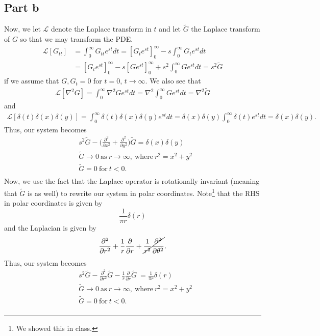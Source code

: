 \documentclass{article}
\begin{document}
\subsection{Part b}
Now, we let $\mathcal{L}$ denote the Laplace transform in $t$ and let $\tilde{G}$ the Laplace transform of $G$ so that we may transform the PDE. 
\begin{align*}
\mathcal{L}[G_{tt}]&=\int_{0}^{\infty}G_{tt}e^{st}dt=\left[G_te^{st}\right]_0^\infty-s\int_{0}^{\infty}G_te^{st}dt\\&=
\left[G_te^{st}\right]_0^\infty-s\left[Ge^{st}\right]_0^\infty+s^2\int_{0}^{\infty}Ge^{st}dt=s^2\tilde{G}
\end{align*}
if we assume that $G,G_t=0$ for $t=0$, $t\to\infty$. We also see that
\begin{align*}
\mathcal{L}[\nabla^2 G]=\int_{0}^{\infty}\nabla^2G e^{st}dt=\nabla^2\int_{0}^{\infty}G e^{st}dt=\nabla^2\tilde{G}
\end{align*}
and
\begin{align*}
\mathcal{L}[\delta(t)\delta(x)\delta(y)]=\int_{0}^{\infty}\delta(t)\delta(x)\delta(y) e^{st}dt=\delta(x)\delta(y)\int_{0}^{\infty}\delta(t)e^{st}dt=\delta(x)\delta(y).
\end{align*}
Thus, our system becomes
\begin{equation*}
	\begin{split}
		&s^2\tilde{G} - \big(\frac{\partial^2}{\partial x^2}+\frac{\partial^2}{\partial y^2}\big)\tilde{G} = \delta(x)\delta(y)\\
		&\tilde G \to 0 \ \text{as} \ r \to \infty, \ \text{where} \ r^2 = x^2+y^2\\
		&\tilde G = 0 \ \text{for}\  t<0.\\
	\end{split}
\end{equation*}
Now, we use the fact that the Laplace operator is rotationally invariant (meaning that $\tilde{G}$ is as well) to rewrite our system in polar coordinates. Note\footnote{We showed this in class.}  that the RHS in polar coordinates is given by
\[
\frac{1}{\pi r}\delta(r)
\]
and the Laplacian is given by
\[
\frac{\partial^2}{\partial r^2}+\frac{1}{r}\frac{\partial}{\partial r}+\cancel{\frac{1}{r^2}\frac{\partial^2}{\partial \theta^2}}.
\]
Thus, our system becomes
\begin{equation*}
	\begin{split}
		&s^2\tilde{G} - \frac{\partial^2}{\partial r^2}\tilde{G}-\frac{1}{r}\frac{\partial}{\partial r}\tilde{G}\ = \frac{1}{\pi r}\delta(r)\\
		&\tilde G \to 0 \ \text{as} \ r \to \infty, \ \text{where} \ r^2 = x^2+y^2\\
		&\tilde G = 0 \ \text{for}\  t<0.\\
	\end{split}
\end{equation*}
\end{document}
